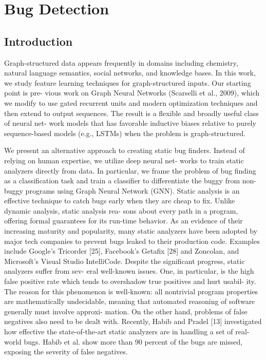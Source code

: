 \documentclass{article}
\begin{document}
\section{Bug Detection}
\subsection{Introduction}

Graph-structured data appears frequently in domains including chemistry, natural language semantics, social networks, and knowledge bases. In this work, we study feature learning techniques for graph-structured inputs. Our starting point is pre- vious work on Graph Neural Networks (Scarselli et al., 2009), which we modify to use gated recurrent units and modern optimization techniques and then extend to output sequences. The result is a flexible and broadly useful class of neural net- work models that has favorable inductive biases relative to purely sequence-based models (e.g., LSTMs) when the problem is graph-structured.

We present an alternative approach to creating static bug finders. Instead of relying on human expertise, we utilize deep neural net- works to train static analyzers directly from data. In particular, we frame the problem of bug finding as a classification task and train a classifier to differentiate the buggy from non-buggy programs using Graph Neural Network (GNN). Static analysis is an effective technique to catch bugs early when they are cheap to fix. Unlike dynamic analysis, static analysis rea- sons about every path in a program, offering formal guarantees for its run-time behavior. As an evidence of their increasing maturity and popularity, many static analyzers have been adopted by major tech companies to prevent bugs leaked to their production code. Examples include Google’s Tricorder [25], Facebook’s Getafix [28] and Zoncolan, and Microsoft’s Visual Studio IntelliCode.
Despite the significant progress, static analyzers suffer from sev- eral well-known issues. One, in particular, is the high false positive rate which tends to overshadow true positives and hurt usabil- ity. The reason for this phenomenon is well-known: all nontrivial program properties are mathematically undecidable, meaning that automated reasoning of software generally must involve approxi- mation. On the other hand, problems of false negatives also need to be dealt with. Recently, Habib and Pradel [13] investigated how effective the state-of-the-art static analyzers are in handling a set of real-world bugs. Habib et al. show more than 90 percent of the bugs are missed, exposing the severity of false negatives.
\end{document}
